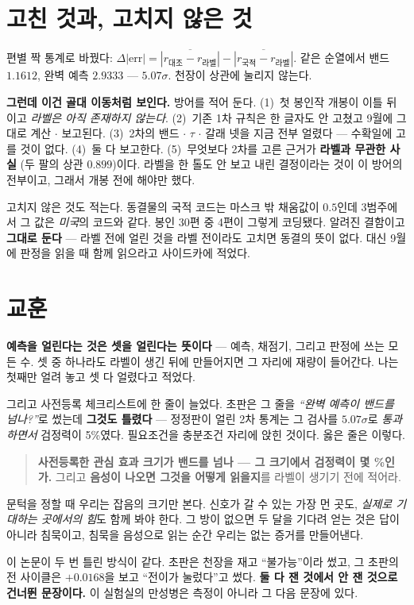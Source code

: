 \documentclass[10pt]{article}
\begin{document}
\section{고친 것과, 고치지 않은 것}

편별 짝 통계로 바꿨다:
$\Delta|\text{err}| = \overline{|r_{\text{대조}}-r_{\text{라벨}}|}
- \overline{|r_{\text{국적}}-r_{\text{라벨}}|}$.
같은 순열에서 밴드 $1.1612$, 완벽 예측 $2.9333$ --- $5.07\sigma$.
천장이 상관에 눌리지 않는다.

\textbf{그런데 이건 골대 이동처럼 보인다.} 방어를 적어 둔다.
(1)~첫 봉인작 개봉이 이틀 뒤이고 \emph{라벨은 아직 존재하지 않는다}.
(2)~기존 1차 규칙은 한 글자도 안 고쳤고 9월에 그대로 계산 $\cdot$
보고된다. (3)~2차의 밴드 $\cdot$ $\tau$ $\cdot$ 갈래 넷을 지금 전부
얼렸다 --- 수확일에 고를 것이 없다. (4)~둘 다 보고한다.
(5)~무엇보다 2차를 고른 근거가 \textbf{라벨과 무관한 사실}
(두 팔의 상관 $0.899$)이다. 라벨을 한 톨도 안 보고 내린 결정이라는
것이 이 방어의 전부이고, 그래서 개봉 전에 해야만 했다.

고치지 않은 것도 적는다. 동결물의 국적 코드는 마스크 밖 채움값이
$0.5$인데 3범주에서 그 값은 \emph{미국}의 코드와 같다. 봉인 30편 중
4편이 그렇게 코딩됐다. 알려진 결함이고 \textbf{그대로 둔다} ---
라벨 전에 얼린 것을 라벨 전이라도 고치면 동결의 뜻이 없다. 대신
9월에 판정을 읽을 때 함께 읽으라고 사이드카에 적었다.

\section{교훈}

\textbf{예측을 얼린다는 것은 셋을 얼린다는 뜻이다} --- 예측, 채점기,
그리고 판정에 쓰는 모든 수. 셋 중 하나라도 라벨이 생긴 뒤에
만들어지면 그 자리에 재량이 들어간다. 나는 첫째만 얼려 놓고 셋 다
얼렸다고 적었다.

그리고 사전등록 체크리스트에 한 줄이 늘었다. 초판은 그 줄을
\emph{``완벽 예측이 밴드를 넘나?''}로 썼는데 \textbf{그것도
틀렸다} --- 정정판이 얼린 2차 통계는 그 검사를 $5.07\sigma$로
\emph{통과하면서} 검정력이 5\%였다. 필요조건을 충분조건 자리에
앉힌 것이다. 옳은 줄은 이렇다.

\begin{quote}
\textbf{사전등록한 관심 효과 크기가 밴드를 넘나 --- 그 크기에서
검정력이 몇 \%인가.} 그리고 \textbf{음성이 나오면 그것을 어떻게
읽을지}를 라벨이 생기기 전에 적어라.
\end{quote}

문턱을 정할 때 우리는 잡음의 크기만 본다. 신호가 갈 수 있는 가장
먼 곳도, \emph{실제로 기대하는 곳에서의 힘}도 함께 봐야 한다.
그 방이 없으면 두 달을 기다려 얻는 것은 답이 아니라 침묵이고,
침묵을 음성으로 읽는 순간 우리는 없는 증거를 만들어낸다.

이 논문이 두 번 틀린 방식이 같다. 초판은 천장을 재고
``불가능''이라 썼고, 그 초판의 전 사이클은 $+0.0168$을 보고
``전이가 눌렀다''고 썼다. \textbf{둘 다 잰 것에서 안 잰 것으로
건너뛴 문장이다.} 이 실험실의 만성병은 측정이 아니라 그 다음
문장에 있다.
\end{document}
